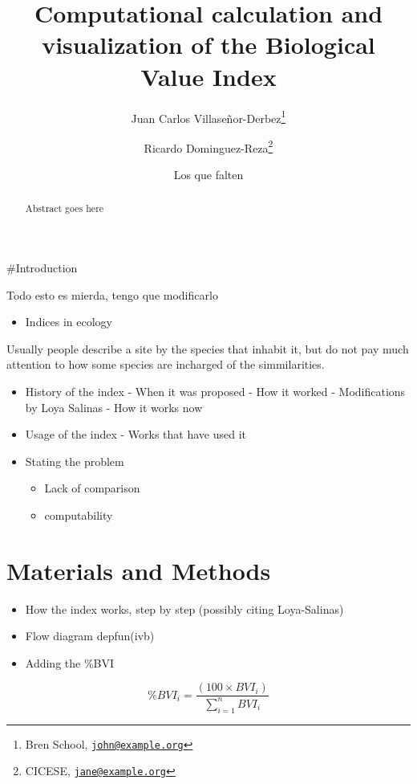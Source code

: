 \documentclass[
]{article}
\title{Computational calculation and visualization of the Biological Value Index}
\author{Juan Carlos Villaseñor-Derbez\footnote{Bren School, \href{mailto:john@example.org}{\nolinkurl{john@example.org}}} \and Ricardo Dominguez-Reza\footnote{CICESE, \href{mailto:jane@example.org}{\nolinkurl{jane@example.org}}} \and Los que falten}
\date{}
\providecommand{\tightlist}{%
  \setlength{\itemsep}{0pt}\setlength{\parskip}{0pt}}
\begin{document}
\maketitle
\begin{abstract}
Abstract goes here
\end{abstract}

{
\setcounter{tocdepth}{2}
\tableofcontents
}
\#Introduction

Todo esto es mierda, tengo que modificarlo

\begin{itemize}
\tightlist
\item
  Indices in ecology
\end{itemize}

Usually people describe a site by the species that inhabit it, but do not pay much attention to how some species are incharged of the simmilarities.

\begin{itemize}
\item
  History of the index
  - When it was proposed
  - How it worked
  - Modifications by Loya Salinas
  - How it works now
\item
  Usage of the index
  - Works that have used it
\item
  Stating the problem

  \begin{itemize}
  \tightlist
  \item
    Lack of comparison
  \item
    computability
  \end{itemize}
\end{itemize}

\hypertarget{materials-and-methods}{%
\section{Materials and Methods}\label{materials-and-methods}}

\begin{itemize}
\item
  How the index works, step by step (possibly citing Loya-Salinas)
\item
  Flow diagram depfun(ivb)
\item
  Adding the \%BVI
\end{itemize}

\begin{equation}\%BVI_i = \frac{(100\times BVI_i)}{\sum_{i = 1}^nBVI_i}\end{equation}
\end{document}
